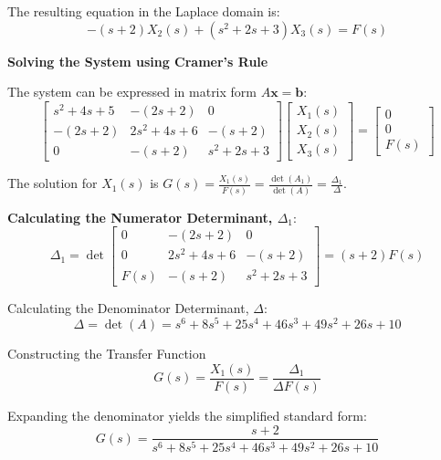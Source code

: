 ﻿\documentclass[11pt]{article}
\begin{document}
The resulting equation in the Laplace domain is:
\begin{equation}
-(s + 2)X_2(s) + (s^2 + 2s + 3)X_3(s) = F(s) \tag{3}
\end{equation}

\noindent\textbf{Solving the System using Cramer's Rule}
\vspace{12pt}

The system can be expressed in matrix form $A\mathbf{x} = \mathbf{b}$:
$$
\begin{bmatrix}
s^2 + 4s + 5 & -(2s + 2) & 0 \\
-(2s + 2) & 2s^2 + 4s + 6 & -(s + 2) \\
0 & -(s + 2) & s^2 + 2s + 3
\end{bmatrix}
\begin{bmatrix}
X_1(s) \\
X_2(s) \\
X_3(s)
\end{bmatrix}
=
\begin{bmatrix}
0 \\
0 \\
F(s)
\end{bmatrix}
$$

The solution for $X_1(s)$ is $G(s) = \frac{X_1(s)}{F(s)} = \frac{\det(A_1)}{\det(A)} = \frac{\Delta_1}{\Delta}$.

\vspace{12pt}
\noindent\textbf{Calculating the Numerator Determinant, $\Delta_1$}:
$$ \Delta_1 = \det
\begin{bmatrix}
0 & -(2s + 2) & 0 \\
0 & 2s^2 + 4s + 6 & -(s + 2) \\
F(s) & -(s + 2) & s^2 + 2s + 3
\end{bmatrix}
= (s + 2)F(s) $$

{Calculating the Denominator Determinant, $\Delta$}:
$$\Delta = \det(A) = s^6 + 8s^5 + 25s^4 + 46s^3 + 49s^2 + 26s + 10$$

{Constructing the Transfer Function}
$$G(s) = \frac{X_1(s)}{F(s)} = \frac{\Delta_1}{\Delta F(s)}$$

Expanding the denominator yields the simplified standard form:
\[
\boxed{
G(s) = \frac{s + 2}{s^6 + 8s^5 + 25s^4 + 46s^3 + 49s^2 + 26s + 10}
}
\]
\end{document}
